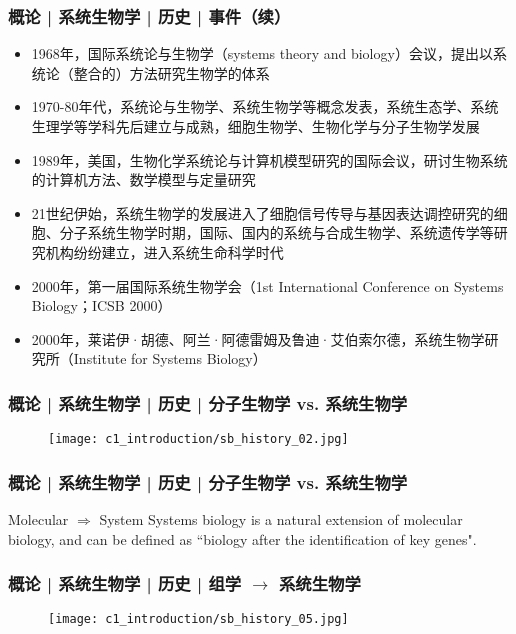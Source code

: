 \begin{frame}
  \frametitle{概论 | 系统生物学 | 历史 | 事件（续）}
  \begin{itemize}
    \item 1968年，国际系统论与生物学（systems theory and biology）会议，提出以系统论（整合的）方法研究生物学的体系
    \item 1970-80年代，系统论与生物学、系统生物学等概念发表，系统生态学、系统生理学等学科先后建立与成熟，细胞生物学、生物化学与分子生物学发展
    \item 1989年，美国，生物化学系统论与计算机模型研究的国际会议，研讨生物系统的计算机方法、数学模型与定量研究
    \item 21世纪伊始，系统生物学的发展进入了细胞信号传导与基因表达调控研究的细胞、分子系统生物学时期，国际、国内的系统与合成生物学、系统遗传学等研究机构纷纷建立，进入系统生命科学时代
    \item 2000年，第一届国际系统生物学会（1st International Conference on Systems Biology；ICSB 2000）
    \item 2000年，莱诺伊·胡德、阿兰·阿德雷姆及鲁迪·艾伯索尔德，系统生物学研究所（Institute for Systems Biology）
  \end{itemize}
\end{frame}

\begin{frame}
  \frametitle{概论 | 系统生物学 | 历史 | 分子生物学 vs. 系统生物学}
  \begin{figure}
    \centering
    \texttt{[image: c1\_introduction/sb\_history\_02.jpg]}
  \end{figure}
\end{frame}

\begin{frame}
  \frametitle{概论 | 系统生物学 | 历史 | 分子生物学 vs. 系统生物学}
  \begin{block}{Molecular $\Rightarrow$ System}
  Systems biology is a natural extension of molecular biology, and can be defined as ``biology after the identification of key genes".
  \end{block}
\end{frame}

\begin{frame}
  \frametitle{概论 | 系统生物学 | 历史 | 组学 $\rightarrow$ 系统生物学}
  \begin{figure}
    \centering
    \texttt{[image: c1\_introduction/sb\_history\_05.jpg]}
  \end{figure}
\end{frame}

